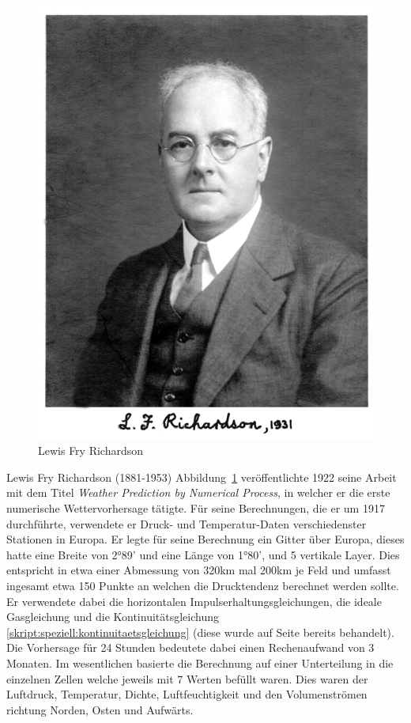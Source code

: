 \begin{refsection}
\begin{figure}
\centering
\includegraphics{klima/richardson.jpg}
\caption{Lewis Fry Richardson \cite{klima:biography}
\label{klima:geschichte:richardson}}
\end{figure}

Lewis Fry Richardson (1881-1953) Abbildung~\ref{klima:geschichte:richardson} veröffentlichte 1922 seine Arbeit mit dem Titel {\em Weather Prediction by Numerical Process}, in welcher er die erste numerische Wettervorhersage tätigte. Für seine Berechnungen, die er um 1917 durchführte, verwendete er Druck- und Temperatur-Daten verschiedenster Stationen in Europa. Er legte für seine Berechnung ein Gitter über Europa, dieses hatte eine Breite von 2°89' und eine Länge von 1°80', und 5 vertikale Layer. Dies entspricht in etwa einer Abmessung von 320km mal 200km je Feld und umfasst ingesamt etwa 150 Punkte an welchen die Drucktendenz berechnet werden sollte. Er verwendete dabei die horizontalen Impulserhaltungsgleichungen, die ideale Gasgleichung und die Kontinuitätsgleichung \eqref{skript:speziell:kontinuitaetsgleichung} (diese wurde auf Seite \pageref{skript:speziell:kontinuitaetsgleichung} bereits behandelt). Die Vorhersage für 24 Stunden bedeutete dabei einen Rechenaufwand von 3 Monaten. Im wesentlichen basierte die Berechnung auf einer Unterteilung in die einzelnen Zellen welche jeweils mit 7 Werten befüllt waren. Dies waren der Luftdruck, Temperatur, Dichte, Luftfeuchtigkeit und den Volumenströmen richtung Norden, Osten und Aufwärts.


\end{refsection}
